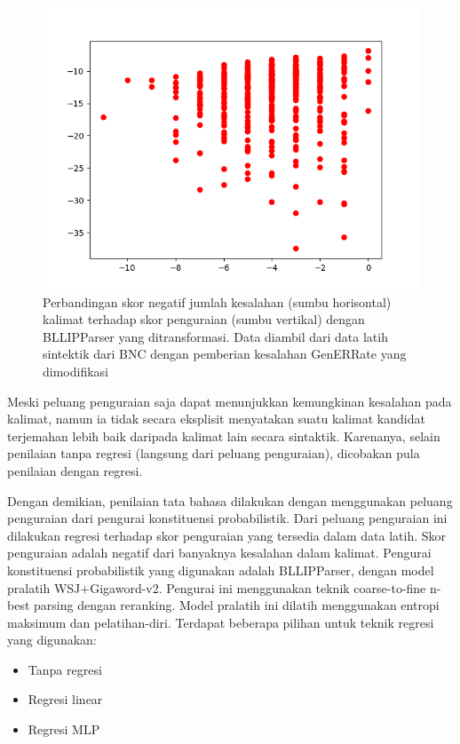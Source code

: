 \documentclass[conference]{IEEEtran}
\begin{document}
\begin{figure}[h]
\centerline{\includegraphics[width=\columnwidth]{figures/figscoretoparseprobtransformed.png}}
\caption{Perbandingan skor negatif jumlah kesalahan (sumbu horisontal) kalimat terhadap skor penguraian (sumbu vertikal) dengan BLLIPParser yang ditransformasi. Data diambil dari data latih sintektik dari BNC dengan pemberian kesalahan GenERRate yang dimodifikasi}
\label{figscoretoparseprobtransformed}
\end{figure}

Meski peluang penguraian saja dapat menunjukkan kemungkinan kesalahan pada kalimat, namun ia tidak secara eksplisit menyatakan suatu kalimat kandidat terjemahan lebih baik daripada kalimat lain secara sintaktik. Karenanya, selain penilaian tanpa regresi (langsung dari peluang penguraian), dicobakan pula penilaian dengan regresi.

Dengan demikian, penilaian tata bahasa dilakukan dengan menggunakan peluang penguraian dari pengurai konstituensi probabilistik. Dari peluang penguraian ini dilakukan regresi terhadap skor penguraian yang tersedia dalam data latih. Skor penguraian adalah negatif dari banyaknya kesalahan dalam kalimat.
Pengurai konstituensi probabilistik yang digunakan adalah BLLIPParser\cite{b5}\cite{b6}\cite{b7}\cite{b8}, dengan model pralatih WSJ+Gigaword-v2. Pengurai ini menggunakan teknik coarse-to-fine n-best parsing dengan reranking. Model pralatih ini dilatih menggunakan entropi maksimum dan pelatihan-diri.
Terdapat beberapa pilihan untuk teknik regresi yang digunakan:

\begin{itemize}
\item Tanpa regresi
\item Regresi linear
\item Regresi MLP
\end{itemize}
\end{document}
